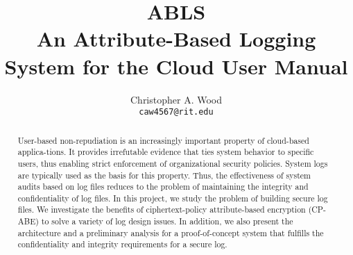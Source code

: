 \documentclass[a4paper,11pt]{report}
\begin{document}
\title{\textbf{ABLS} \\ An Attribute-Based Logging System for the Cloud {\small User Manual}}
\author{Christopher A. Wood \\ {\tt caw4567@rit.edu}}
\maketitle
\begin{abstract}\centering
User-based non-repudiation is an increasingly important property of cloud-based applica-tions. It provides irrefutable evidence that ties system behavior to specific users, thus enabling strict enforcement of organizational security policies. System logs are typically used as the basis for this property. Thus, the effectiveness of system audits based on log files reduces to the problem of maintaining the integrity and confidentiality of log files. In this project, we study the problem of building secure log files. We investigate the benefits of ciphertext-policy attribute-based encryption (CP-ABE) to solve a variety of log design issues. In addition, we also present the architecture and a preliminary analysis for a proof-of-concept system that fulfills the confidentiality and integrity requirements for a secure log.
\end{abstract}
\tableofcontents

%
%
%
%
%
%

{}

\end{document}
